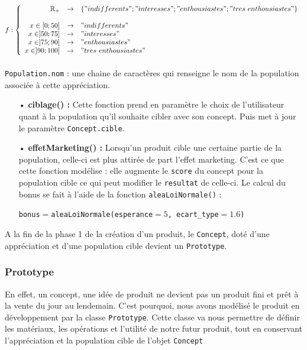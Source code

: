 $
f : \left\{ 
\begin{array}{r c l}
\mathbb{R}_{+} &\to  &\{"indifferents";"interesses";"enthousiastes";"tres\ enthousiastes"\} \\\\
x\in [0;50] &\to &"indifferents"\\
x\in ]50;75] &\to &"interesses"\\
x\in ]75;90] &\to &"enthousiastes"\\
x\in ]90;100] &\to &"tres\ enthousiastes"
\end{array}
\right.
$\\\\
\texttt{Population.nom} : une chaine de caractères qui renseigne le nom de la population associée à cette appréciation.
\begin{enumerate}
	\item[•] \textbf{ciblage() :} Cette fonction prend en paramètre le choix de l'utilisateur quant à la population qu'il souhaite cibler avec son concept. Puis met à jour le paramètre \texttt{Concept.cible}.
	\item[•] \textbf{effetMarketing() :} Lorsqu'un produit cible une certaine partie de la population, celle-ci est plus attirée de part l'effet marketing. C'est ce que cette fonction modélise : elle augmente le \texttt{score} du concept pour la population cible ce qui peut modifier le \texttt{resultat} de celle-ci. Le calcul du bonus se fait à l'aide de la fonction \texttt{aleaLoiNormale()} :
	\begin{center}
		\texttt{bonus}$=$\texttt{aleaLoiNormale(esperance$=5$, ecart\_type$=1.6$)}
	\end{center}
\end{enumerate}

A la fin de la phase 1 de la création d'un produit, le \texttt{Concept}, doté d'une appréciation et d'une population cible devient un \texttt{Prototype}.

  
\subsubsection{Prototype}

En effet, un concept, une idée de produit ne devient pas un produit fini et prêt à la vente du jour au lendemain. C'est pourquoi, nous avons modélisé le produit en développement par la classe \texttt{Prototype}. Cette classe va nous permettre de définir les matériaux, les opérations et l'utilité de notre futur produit, tout en conservant l'appréciation et la population cible de l'objet \texttt{Concept}\\

